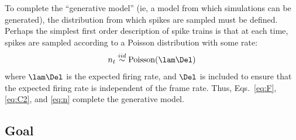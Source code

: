 To complete the ``generative model'' (ie, a model from which simulations can be generated), the distribution from which spikes are sampled must be defined.  Perhaps the simplest first order description of spike trains is that at each time, spikes are sampled according to a Poisson distribution with some rate:
\begin{align} \label{eq:n}
	n_t \overset{iid}{\sim} \text{Poisson}(\lam \Del)
\end{align}
\noindent where $\lam \Del$ is the expected firing rate, and $\Del$ is included to ensure that the expected firing rate is independent of the frame rate.  Thus, Eqs.~\eqref{eq:F}, \eqref{eq:C2}, and \eqref{eq:n} complete the generative model.  






\subsection{Goal} \label{sec:goal}

